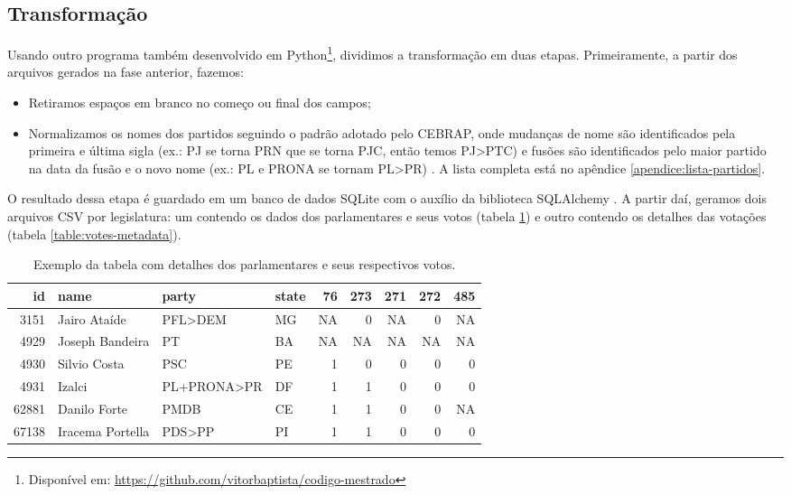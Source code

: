 \documentclass[a4paper,titlepage]{ppgi}\usepackage[]{graphicx}\usepackage[]{color}
\newenvironment{knitrout}{}{} %
\begin{document}
\subsection{Transformação}
\label{sec:miolo:transformacao}

Usando outro programa também desenvolvido em Python\footnote{Disponível em:
\url{https://github.com/vitorbaptista/codigo-mestrado}}, dividimos a
transformação em duas etapas. Primeiramente, a partir dos arquivos gerados na
fase anterior, fazemos:

\begin{itemize}
  \item Retiramos espaços em branco no começo ou final dos campos;
  \item Normalizamos os nomes dos partidos seguindo o padrão adotado pelo
\gls{CEBRAP}, onde mudanças de nome são identificados pela primeira e última
sigla (ex.: PJ se torna PRN que se torna PJC, então temos PJ>PTC) e fusões são
identificados pelo maior partido na data da fusão e o novo nome (ex.: PL e
PRONA se tornam PL>PR) \cite{Freitas2008}. A lista completa está no apêndice
\ref{apendice:lista-partidos}.
\end{itemize}

O resultado dessa etapa é guardado em um banco de dados SQLite com o auxílio da
biblioteca SQLAlchemy
\cite{SQLite3,SQLAlchemy}. A partir daí, geramos dois arquivos \gls{CSV} por
legislatura: um contendo os dados dos parlamentares e seus votos (tabela
\ref{table:votes}) e outro contendo os detalhes das votações (tabela
\ref{table:votes-metadata}).

\begin{table}
\centering
\begin{knitrout}
\color{fgcolor}
\begin{tabular}{r|l|l|l|r|r|r|r|r}
\hline
id & name & party & state & 76 & 273 & 271 & 272 & 485\\
\hline
3151 & Jairo Ataíde & PFL>DEM & MG & NA & 0 & NA & 0 & NA\\
\hline
4929 & Joseph Bandeira & PT & BA & NA & NA & NA & NA & NA\\
\hline
4930 & Silvio Costa & PSC & PE & 1 & 0 & 0 & 0 & 0\\
\hline
4931 & Izalci & PL+PRONA>PR & DF & 1 & 1 & 0 & 0 & 0\\
\hline
62881 & Danilo Forte & PMDB & CE & 1 & 1 & 0 & 0 & NA\\
\hline
67138 & Iracema Portella & PDS>PP & PI & 1 & 1 & 0 & 0 & 0\\
\hline
\end{tabular}


\end{knitrout}
\caption{Exemplo da tabela com detalhes dos parlamentares e seus respectivos votos.}
\label{table:votes}
\end{table}
\end{document}
